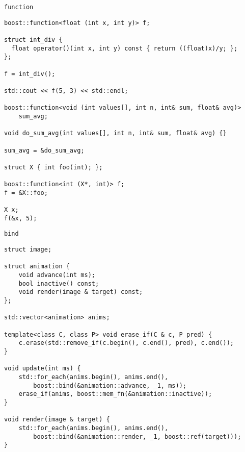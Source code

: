 \documentclass{beamer}
\begin{document}
\begin{frame}[fragile]{{\tt function}}
\small
\begin{lstlisting}
boost::function<float (int x, int y)> f;

struct int_div { 
  float operator()(int x, int y) const { return ((float)x)/y; }; 
};

f = int_div();

std::cout << f(5, 3) << std::endl;

boost::function<void (int values[], int n, int& sum, float& avg)>
    sum_avg;

void do_sum_avg(int values[], int n, int& sum, float& avg) {}

sum_avg = &do_sum_avg;

struct X { int foo(int); };

boost::function<int (X*, int)> f;
f = &X::foo;

X x;
f(&x, 5);
\end{lstlisting}
\end{frame}

\begin{frame}[fragile]{{\tt bind}}
\small
\begin{lstlisting}
struct image;

struct animation {
    void advance(int ms);
    bool inactive() const;
    void render(image & target) const;
};

std::vector<animation> anims;

template<class C, class P> void erase_if(C & c, P pred) {
    c.erase(std::remove_if(c.begin(), c.end(), pred), c.end());
}

void update(int ms) {
    std::for_each(anims.begin(), anims.end(), 
        boost::bind(&animation::advance, _1, ms));
    erase_if(anims, boost::mem_fn(&animation::inactive));
}

void render(image & target) {
    std::for_each(anims.begin(), anims.end(), 
        boost::bind(&animation::render, _1, boost::ref(target)));
}
\end{lstlisting}
\end{frame}
\end{document}
